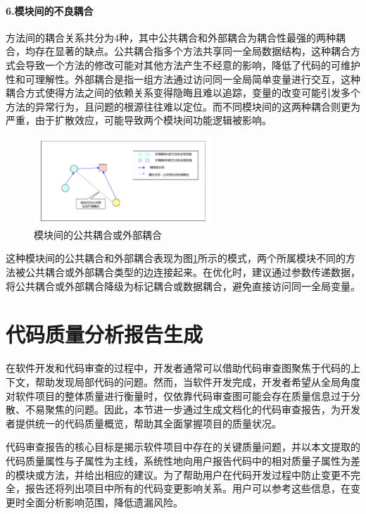 \paragraph{6.模块间的不良耦合} 方法间的耦合关系共分为4种，其中公共耦合和外部耦合为耦合性最强的两种耦合，均存在显著的缺点。公共耦合指多个方法共享同一全局数据结构，这种耦合方式会导致一个方法的修改可能对其他方法产生不经意的影响，降低了代码的可维护性和可理解性。外部耦合是指一组方法通过访问同一全局简单变量进行交互，这种耦合方式使得方法之间的依赖关系变得隐晦且难以追踪，变量的改变可能引发多个方法的异常行为，且问题的根源往往难以定位。而不同模块间的这两种耦合则更为严重，由于扩散效应，可能导致两个模块间功能逻辑被影响。


\begin{figure}[h]
\centering
\includegraphics[width = 0.6\textwidth]{figures/模块间公共耦合.pdf}
\caption{模块间的公共耦合或外部耦合}
\label{1_模块间的公共耦合或外部耦合}
\end{figure}

这种模块间的公共耦合和外部耦合表现为图\ref{1_模块间的公共耦合或外部耦合}所示的模式，两个所属模块不同的方法被公共耦合或外部耦合类型的边连接起来。在优化时，建议通过参数传递数据，将公共耦合或外部耦合降级为标记耦合或数据耦合，避免直接访问同一全局变量。



\section{代码质量分析报告生成}

在软件开发和代码审查的过程中，开发者通常可以借助代码审查图聚焦于代码的上下文，帮助发现局部代码的问题。然而，当软件开发完成，开发者希望从全局角度对软件项目的整体质量进行衡量时，仅依靠代码审查图可能会存在质量信息过于分散、不易聚焦的问题。因此，本节进一步通过生成文档化的代码审查报告，为开发者提供统一的代码质量概览，帮助其全面掌握项目的质量状况。

代码审查报告的核心目标是揭示软件项目中存在的关键质量问题，并以本文提取的代码质量属性与子属性为主线，系统性地向用户报告代码中的相对质量子属性为差的模块或方法，并给出相应的建议。为了帮助用户在代码开发过程中防止变更不完全，报告还将列出项目中所有的代码变更影响关系。用户可以参考这些信息，在变更时全面分析影响范围，降低遗漏风险。

